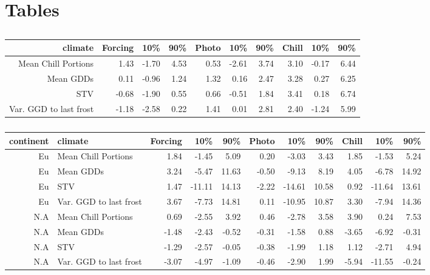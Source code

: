 \documentclass[12pt]{article}\usepackage[]{graphicx}\usepackage[]{color}
\begin{document}
\section*{Tables}
\begin{table}
\centering
\begin{tabular}{|r|rrr|rrr|rrr|}
  \hline
  climate & Forcing & 10\% & 90\% & Photo & 10\% & 90\% & Chill & 10\% & 90\% \\ 
  \hline
 Mean Chill Portions & 1.43 & -1.70 & 4.53 & 0.53 & -2.61 & 3.74 & 3.10 & -0.17 & 6.44 \\ 
  Mean GDDs & 0.11 & -0.96 & 1.24 & 1.32 & 0.16 & 2.47 & 3.28 & 0.27 & 6.25 \\ 
   STV & -0.68 & -1.90 & 0.55 & 0.66 & -0.51 & 1.84 & 3.41 & 0.18 & 6.74 \\ 
   Var. GGD to last frost & -1.18 & -2.58 & 0.22 & 1.41 & 0.01 & 2.81 & 2.40 & -1.24 & 5.99 \\ 
   \hline
\end{tabular}
\label{tab:outfull}
\caption{}
\end{table}

\begin{table}
\centering
\begin{tabular}{|r|p{3 cm}|rrr|rrr|rrr|}
  \hline
  \hline
 continent & climate & Forcing & 10\% & 90\% & Photo & 10\% & 90\% & Chill & 10\% & 90\% \\ 
  \hline
 Eu & Mean Chill Portions & 1.84 & -1.45 & 5.09 & 0.20 & -3.03 & 3.43 & 1.85 & -1.53 & 5.24 \\ 
 \hline
    Eu & Mean GDDs & 3.24 & -5.47 & 11.63 & -0.50 & -9.13 & 8.19 & 4.05 & -6.78 & 14.92 \\ 
    \hline
    Eu & STV & 1.47 & -11.11 & 14.13 & -2.22 & -14.61 & 10.58 & 0.92 & -11.64 & 13.61 \\ 
    \hline
    Eu & Var. GGD to last frost & 3.67 & -7.73 & 14.81 & 0.11 & -10.95 & 10.87 & 3.30 & -7.94 & 14.36 \\ 
    \hline
    \hline
    N.A & Mean Chill Portions & 0.69 & -2.55 & 3.92 & 0.46 & -2.78 & 3.58 & 3.90 & 0.24 & 7.53 \\ 
    \hline
    N.A & Mean GDDs & -1.48 & -2.43 & -0.52 & -0.31 & -1.58 & 0.88 & -3.65 & -6.92 & -0.31 \\ 
    \hline
    N.A & STV & -1.29 & -2.57 & -0.05 & -0.38 & -1.99 & 1.18 & 1.12 & -2.71 & 4.94 \\ 
    \hline
    N.A & Var. GGD to last frost & -3.07 & -4.97 & -1.09 & -0.46 & -2.90 & 1.99 & -5.94 & -11.55 & -0.24 \\ 
  \hline
   \hline
\end{tabular}
\label{tab:outcont}
\caption{}
\end{table}
\end{document}
